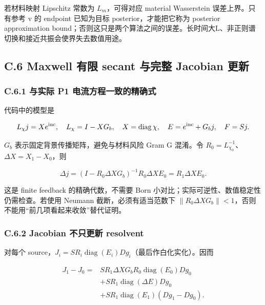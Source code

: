 \documentclass[
  11pt,
  a4paper,
]{article}
\begin{document}
若材料映射 Lipschitz 常数为 \(L_m\)，可得对应 material Wasserstein
误差上界。只有参考 v 的 endpoint 已知为目标 posterior，才能把它称为
posterior approximation
bound；否则这只是两个算法之间的误差。长时间大L、非正则谱切换和接近共振会使界失去数值用途。

\hypertarget{c.6-maxwell-ux6709ux9650-secant-ux4e0eux5b8cux6574-jacobian-ux66f4ux65b0}{%
\subsection{C.6 Maxwell 有限 secant 与完整 Jacobian
更新}\label{c.6-maxwell-ux6709ux9650-secant-ux4e0eux5b8cux6574-jacobian-ux66f4ux65b0}}

\hypertarget{c.6.1-ux4e0eux5b9eux9645-p1-ux7535ux6d41ux65b9ux7a0bux4e00ux81f4ux7684ux7cbeux786eux5f0f}{%
\subsubsection{C.6.1 与实际 P1
电流方程一致的精确式}\label{c.6.1-ux4e0eux5b9eux9645-p1-ux7535ux6d41ux65b9ux7a0bux4e00ux81f4ux7684ux7cbeux786eux5f0f}}

代码中的模型是

\[
L_\chi j=Xe^{\rm inc},\quad L_\chi=I-XG_b,\quad X=\operatorname{diag}\chi,
\quad E=e^{\rm inc}+G_bj,\quad F=Sj.
\]

\(G_b\) 表示固定背景传播矩阵，避免与材料风险 Gram G 混淆。令
\(R_0=L_{\chi_0}^{-1}\)、\(\Delta X=X_1-X_0\)，则

\[
\boxed{\Delta j=(I-R_0\Delta XG_b)^{-1}R_0\Delta X E_0
=R_1\Delta X E_0.}
\]

这是 finite feedback 的精确代数，不需要 Born
小对比；实际可逆性、数值稳定性仍需检查。若使用 Neumann
截断，必须有适当范数下
\(\|R_0\Delta XG_b\|<1\)，否则不能用``前几项看起来收敛''替代证明。

\hypertarget{c.6.2-jacobian-ux4e0dux53eaux66f4ux65b0-resolvent}{%
\subsubsection{C.6.2 Jacobian 不只更新
resolvent}\label{c.6.2-jacobian-ux4e0dux53eaux66f4ux65b0-resolvent}}

对每个
source，\(J_i=S R_i\operatorname{diag}(E_i)Dg_i\)（最后作白化实化）。因而

\[
\begin{aligned}
J_1-J_0={}&S R_1\Delta XG_bR_0\operatorname{diag}(E_0)Dg_0\\
&+S R_1\operatorname{diag}(\Delta E)Dg_0\\
&+S R_1\operatorname{diag}(E_1)(Dg_1-Dg_0).
\end{aligned}
\]
\end{document}
